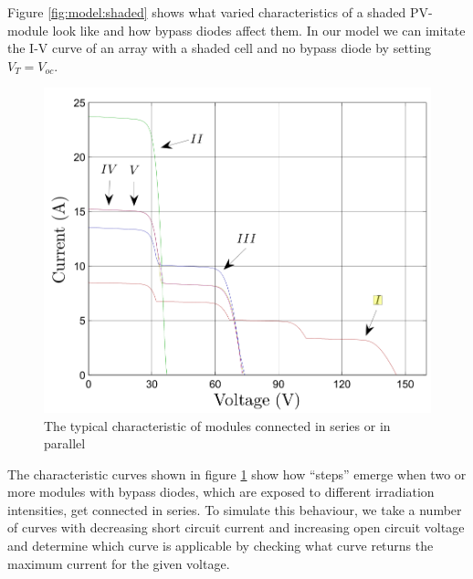 Figure \ref{fig:model:shaded}  shows  what  varied  characteristics  of a shaded
PV-module  look  like  and  how  bypass  diodes affect them. In our model we can
imitate  the  I-V  curve of an array with a shaded cell and no bypass  diode  by
setting $V_T = V_{oc}$.

\begin{figure}[h]
	\center
    \includegraphics[width=.5\textwidth]{images/model/steps.png}
    \caption{The typical characteristic of modules connected in series or in parallel}
    \label{fig:model:steps}
\end{figure}
The  characteristic  curves  shown  in  figure  \ref{fig:model:steps}  show  how
``steps'' emerge when two or more modules  with bypass diodes, which are exposed
to different irradiation intensities, get  connected in series. To simulate this
behaviour, we take  a number of curves with decreasing short circuit current and
increasing  open  circuit  voltage  and  determine  which curve is applicable by
checking  what  curve  returns  the  maximum  current  for  the  given  voltage.

